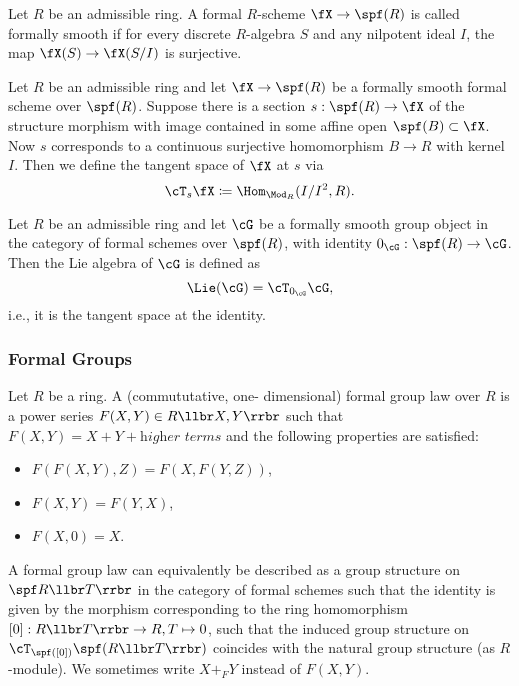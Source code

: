 \documentclass[../main.tex]{subfiles}
\begin{document}
\begin{defi}
    Let $R$ be an admissible ring. A formal $R$-scheme $\fX \to \spf(R)$ is called
    formally smooth if for every discrete $R$-algebra $S$ and any
    nilpotent ideal $I$, the map $\fX(S) \to \fX(S/I)$ is surjective.
\end{defi}

\begin{defi}
    Let $R$ be an admissible ring and let $\fX \to \spf(R)$ be a formally smooth
    formal scheme over $\spf(R)$. Suppose there is a section
    $s: \spf(R) \to \fX$ of the structure morphism with image contained in
    some affine open $\spf(B) \subset \fX$. Now $s$ corresponds
    to a continuous surjective homomorphism $B \to R$ with kernel $I$.
    Then we define the tangent space of $\fX$ at $s$ via 
    \begin{equation*}
        \cT_s \fX \coloneqq \Hom_{\Mod_R}(I/I^2, R).
    \end{equation*}
\end{defi}

\begin{defi}
    Let $R$ be an admissible ring and let $\cG$ be a formally smooth group
    object in the category of formal schemes over $\spf(R)$, with identity 
    $0_{\cG}: \spf(R) \to \cG$. Then the Lie algebra of $\cG$ is defined as
    \begin{equation*}
        \Lie(\cG) = \cT_{0_{\cG}} \cG,
    \end{equation*}
    i.e., it is the tangent space at the identity.
\end{defi}

\subsubsection{Formal Groups} %
\label{ssub:Formal Groups}

\begin{defi}
    Let $R$ be a ring. A (commututative, one-\allowbreak
    dimen\-sional) formal group law over $R$ is a power series $F(X,Y) \in
    R\llbr X, Y \rrbr$ such that $F(X,Y) = X + Y + \textit{higher terms}$ and
    the following properties are satisfied:
    \begin{itemize}
        \item $F(F(X,Y),Z) = F(X,F(Y,Z))$,
        \item $F(X,Y) = F(Y,X)$,
        \item $F(X,0) = X$.
    \end{itemize}
    A formal group law can equivalently be described as a group structure
    on $\spf R\llbr T \rrbr$ in the category of formal schemes such that
    the identity is given by the morphism corresponding to the ring homomorphism
    $[0]: R\llbr T \rrbr \to R, T \mapsto 0$, such that the
    induced group structure on $\cT_{\spf([0])}\spf(R\llbr T \rrbr)$ coincides with
    the natural group structure (as $R$-module). We sometimes write 
    $X +_F Y$ instead of $F(X,Y)$.
\end{defi}
\end{document}
